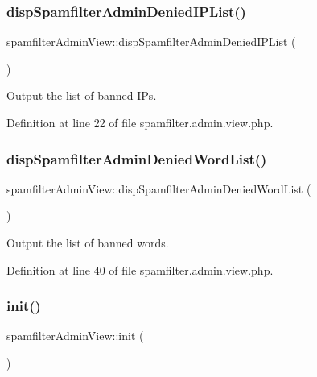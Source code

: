 \subsubsection{\texorpdfstring{disp\+Spamfilter\+Admin\+Denied\+I\+P\+List()}{dispSpamfilterAdminDeniedIPList()}}
{\footnotesize\ttfamily spamfilter\+Admin\+View\+::disp\+Spamfilter\+Admin\+Denied\+I\+P\+List (\begin{DoxyParamCaption}{ }\end{DoxyParamCaption})}



Output the list of banned I\+Ps. 



Definition at line 22 of file spamfilter.\+admin.\+view.\+php.

\mbox{\label{classspamfilterAdminView_a1cca57b5c55b8739e21fa3e3a984df72}} 
\subsubsection{\texorpdfstring{disp\+Spamfilter\+Admin\+Denied\+Word\+List()}{dispSpamfilterAdminDeniedWordList()}}
{\footnotesize\ttfamily spamfilter\+Admin\+View\+::disp\+Spamfilter\+Admin\+Denied\+Word\+List (\begin{DoxyParamCaption}{ }\end{DoxyParamCaption})}



Output the list of banned words. 



Definition at line 40 of file spamfilter.\+admin.\+view.\+php.

\mbox{\label{classspamfilterAdminView_a730d6c05c58e74495095975303da5be1}} 
\subsubsection{\texorpdfstring{init()}{init()}}
{\footnotesize\ttfamily spamfilter\+Admin\+View\+::init (\begin{DoxyParamCaption}{ }\end{DoxyParamCaption})}



